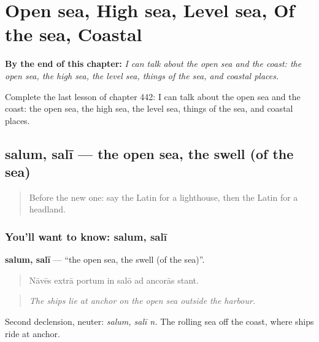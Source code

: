 
\chapter{Open sea, High sea, Level sea, Of the sea, Coastal}
\label{ch:la-open-sea-high-sea-level-sea-of-the-sea-coastal}

\begin{chapteropening}
\textbf{By the end of this chapter:} \emph{I can talk about the open sea and the coast: the open sea, the high sea, the level sea, things of the sea, and coastal places.}

Complete the last lesson of chapter 442: I can talk about the open sea and the coast: the open sea, the high sea, the level sea, things of the sea, and coastal places.
\end{chapteropening}

\section[salum, salī]{salum, salī — the open sea, the swell (of the sea)}

\label{lesson:LA-C442-salum}



\begin{quote}
Before the new one: say the Latin for a lighthouse, then the Latin for a headland.
\end{quote}

\subsection*{You'll want to know: salum, salī}
\textbf{salum, salī} — \textquotedblleft{}the open sea, the swell (of the sea)\textquotedblright{}.

\begin{quote}
Nāvēs extrā portum in salō ad ancorās stant.
\end{quote}

\begin{quote}
\emph{The ships lie at anchor on the open sea outside the harbour.}
\end{quote}

Second declension, neuter: \emph{salum, salī n.} The rolling sea off the coast, where ships ride at anchor.

